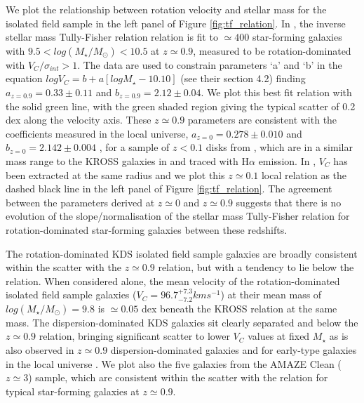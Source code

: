 \documentclass[fleqn,usenatbib]{mnras}
\begin{document}
We plot the relationship between rotation velocity and stellar mass for the isolated field sample in the left panel of Figure \ref{fig:tf_relation}.
In \cite{Harrison2017}, the inverse stellar mass Tully-Fisher relation relation is fit to $\simeq400$ star-forming galaxies with $9.5 < log(M_{\star}/M_{\odot}) < 10.5$ at $z\simeq0.9$, measured to be rotation-dominated with $V_{C}/\sigma_{int} > 1$.
The data are used to constrain parameters `a' and `b' in the equation $logV_{C}=b+a[logM_{\star} - 10.10]$ (see their section 4.2) finding $a_{z=0.9} = 0.33 \pm 0.11$ and $b_{z=0.9} = 2.12 \pm 0.04$.
We plot this best fit relation with the solid green line, with the green shaded region giving the typical scatter of 0.2 dex along the velocity axis.
These $z\simeq0.9$ parameters are consistent with the coefficients measured in the local universe, $a_{z=0} = 0.278 \pm 0.010$ and $b_{z=0} = 2.142 \pm 0.004$ , for a sample of $z<0.1$ disks from \cite{Reyes2011}, which are in a similar mass range to the KROSS galaxies in \cite{Harrison2017} and traced with H$\alpha$ emission.
In \cite{Reyes2011}, $V_{C}$ has been extracted at the same radius and we plot this $z\simeq0.1$ local relation as the dashed black line in the left panel of Figure \ref{fig:tf_relation}.
The agreement between the parameters derived at $z\simeq0$ and $z\simeq0.9$ suggests that there is no evolution of the slope/normalisation of the stellar mass Tully-Fisher relation for rotation-dominated star-forming galaxies between these redshifts. 

The rotation-dominated KDS isolated field sample galaxies are broadly consistent within the scatter with the $z\simeq0.9$ relation, but with a tendency to lie below the relation.
When considered alone, the mean velocity of the rotation-dominated isolated field sample galaxies ($V_{C} = 96.7^{+7.3}_{-7.2}kms^{-1}$) at their mean mass of $log(M_{\star}/M_{\odot})=9.8$ is $\simeq0.05$ dex beneath the KROSS relation at the same mass.
The dispersion-dominated KDS galaxies sit clearly separated and below the $z\simeq0.9$ relation, bringing significant scatter to lower $V_{C}$ values at fixed $M_{\star}$ as is also observed in $z\simeq0.9$ dispersion-dominated galaxies and for early-type galaxies in the local universe \citep[e.g.][]{Romanowsky2012}. 
We plot also the five galaxies from the AMAZE Clean ($z\simeq3$) sample, which are consistent within the scatter with the relation for typical star-forming galaxies at $z\simeq0.9$. \\
\end{document}

